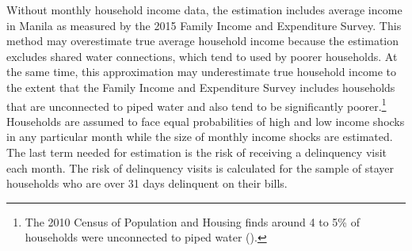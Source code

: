 \documentclass[12pt]{article}
\begin{document}
Without monthly household income data, the estimation includes average income in Manila as measured by the 2015 Family Income and Expenditure Survey.  This method may overestimate true average household income because the estimation excludes shared water connections, which tend to used by poorer households.  At the same time, this approximation may underestimate true household income to the extent that the Family Income and Expenditure Survey includes households that are unconnected to piped water and also tend to be significantly poorer.\footnote{The 2010 Census of Population and Housing finds around 4 to 5\% of households were unconnected to piped water (\cite{wjv}).}  Households are assumed to face equal probabilities of high and low income shocks in any particular month while the size of monthly income shocks are estimated.  The last term needed for estimation is the risk of receiving a delinquency visit each month.  The risk of delinquency visits is calculated for the sample of stayer households who are over 31 days delinquent on their bills. %

\begin{table}[H]
\centering
\caption{Calibrated and Assumed Parameters}\label{table:calibratedparam}
\vspace{-2mm}
\end{table}
\end{document}
